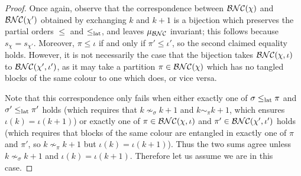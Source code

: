 \begin{proof}
	Once again, observe that the correspondence between $\mathcal{BNC}(\chi)$ and $\mathcal{BNC}(\chi')$ obtained by exchanging $k$ and $k+1$ is a bijection which preserves the partial orders $\leq$ and $\leq_{{\operatorname{lat}}}$, and leaves $\mu_{\mathcal{BNC}}$ invariant; this follows because $s_\chi = s_{\chi'}$.
	Moreover, $\pi \leq \iota$ if and only if $\pi' \leq \iota'$, so the second claimed equality holds.
	However, it is not necessarily the case that the bijection takes $\mathcal{BNC}(\chi, \iota)$ to $\mathcal{BNC}(\chi', \iota')$, as it may take a partition $\pi \in \mathcal{BNC}(\chi)$ which has no tangled blocks of the same colour to one which does, or vice versa.

	Note that this correspondence only fails when either exactly one of $\sigma \leq_{{\operatorname{lat}}} \pi$ and $\sigma'\leq_{{\operatorname{lat}}}\pi'$ holds (which requires that $k \nsim_\sigma k+1$ and $k\sim_\pi k+1$, which ensures $\iota(k) = \iota(k+1)$) or exactly one of $\pi \in \mathcal{BNC}(\chi, \iota)$ and $\pi' \in \mathcal{BNC}(\chi', \iota')$ holds (which requires that blocks of the same colour are entangled in exactly one of $\pi$ and $\pi'$, so $k \nsim_\pi k+1$ but $\iota(k) = \iota(k+1)$).
	Thus the two sums agree unless $k \nsim_\sigma k+1$ and $\iota(k) = \iota(k+1)$.
	Therefore let us assume we are in this case.


\end{proof}
